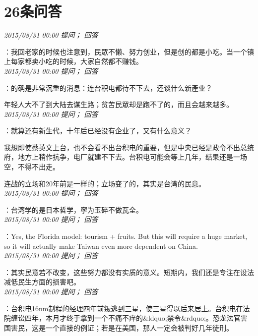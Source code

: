 \documentclass[twocolumn]{ctexart}
\begin{document}
\section{26条问答}

\textit{\hfill\noindent\small 2015/08/31 00:00 提问； 回答}

：我回老家的时候也注意到，民眾不懒、努力创业，但是创的都是小吃。当一个镇上每家都卖小吃的时候，大家自然都不赚钱。\\

\textit{\hfill\noindent\small 2015/08/31 00:00 提问； 回答}

：的确是非常沉重的消息：连台积电都待不下去，还谈什么新產业？

年轻人大不了到大陆去谋生路；贫苦民眾却是跑不了的，而且会越来越多。\\

\textit{\hfill\noindent\small 2015/08/31 00:00 提问； 回答}

：就算还有新生代，十年后已经没有企业了，又有什么意义？

我想即使蔡英文上台，也不会看不出台积电的重要，但是中央已经是政令不出总统府，地方上稍作抗争，电厂就建不下去。台积电可能会等上几年，结果还是一场空，不得不出走。

连战的立场和20年前是一样的；立场变了的，其实是台湾的民意。\\

\textit{\hfill\noindent\small 2015/08/31 00:00 提问； 回答}

：台湾学的是日本哲学，寧为玉碎不做瓦全。\\

\textit{\hfill\noindent\small 2015/08/31 00:00 提问； 回答}

：Yes, the Florida model: tourism + fruits. But this will require a huge market, so it will actually make Taiwan even more dependent on China.\\

\textit{\hfill\noindent\small 2015/08/31 00:00 提问； 回答}

：其实民意若不改变，这些努力都没有实质的意义。短期内，我们还是专注在设法减低民生方面的损害吧。\\

\textit{\hfill\noindent\small 2015/08/31 00:00 提问； 回答}

：台积电16nm制程的经理四年前叛逃到三星，使三星得以后来居上。台积电在法院缠讼四年，本月才终于拿到一个不痛不痒的\&ldquo;禁令\&rdquo;。恐龙法官害国害民，这是一个直接的例证；若是在美国，那人一定会被判好几年徒刑。
\end{document}
